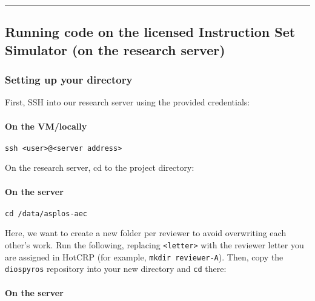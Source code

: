 \begin{center}\rule{0.5\linewidth}{0.5pt}\end{center}

\hypertarget{running-code-on-the-licensed-instruction-set-simulator-on-the-research-server}{%
\subsection{Running code on the licensed Instruction Set Simulator (on
the research
server)}\label{running-code-on-the-licensed-instruction-set-simulator-on-the-research-server}}

\hypertarget{setting-up-your-directory}{%
\subsubsection{Setting up your
directory}\label{setting-up-your-directory}}

First, SSH into our research server using the provided credentials:

\hypertarget{on-the-vmlocally}{%
\paragraph{On the VM/locally}\label{on-the-vmlocally}}

\begin{verbatim}
ssh <user>@<server address>
\end{verbatim}

On the research server, cd to the project directory:

\hypertarget{on-the-server}{%
\paragraph{On the server}\label{on-the-server}}

\begin{verbatim}
cd /data/asplos-aec
\end{verbatim}

Here, we want to create a new folder per reviewer to avoid overwriting
each other's work. Run the following, replacing
\texttt{\textless{}letter\textgreater{}} with the reviewer letter you
are assigned in HotCRP (for example, \texttt{mkdir\ reviewer-A}). Then,
copy the \texttt{diospyros} repository into your new directory and
\texttt{cd} there:

\hypertarget{on-the-server-1}{%
\paragraph{On the server}\label{on-the-server-1}}

